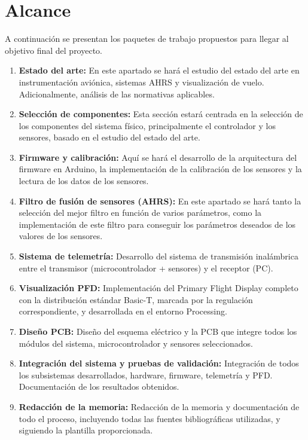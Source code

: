 \chapter{Alcance}

A continuación se presentan los paquetes de trabajo propuestos para llegar al objetivo final del proyecto.

\begin{enumerate}[font=\bfseries]
    \item \textbf{Estado del arte:} En este apartado se hará el estudio del estado del arte en instrumentación aviónica, sistemas AHRS y visualización de vuelo. Adicionalmente, análisis de las normativas aplicables.
    
    \item \textbf{Selección de componentes:} Esta sección estará centrada en la selección de los componentes del sistema físico, principalmente el controlador y los sensores, basado en el estudio del estado del arte.
    
    \item \textbf{Firmware y calibración:} Aquí se hará el desarrollo de la arquitectura del firmware en Arduino, la implementación de la calibración de los sensores y la lectura de los datos de los sensores.
    
    \item \textbf{Filtro de fusión de sensores (AHRS):} En este apartado se hará tanto la selección del mejor filtro en función de varios parámetros, como la implementación de este filtro para conseguir los parámetros deseados de los valores de los sensores.
    
    \item \textbf{Sistema de telemetría:} Desarrollo del sistema de transmisión inalámbrica entre el transmisor (microcontrolador + sensores) y el receptor (PC). 
    
    \item \textbf{Visualización PFD:} Implementación del Primary Flight Display completo con la distribución estándar Basic-T, marcada por la regulación correspondiente,  y desarrollada en el entorno Processing. 

    \item \textbf{Diseño PCB:} Diseño del esquema eléctrico y la PCB que integre todos los módulos del sistema, microcontrolador y sensores seleccionados.
    
    \item \textbf{Integración del sistema y pruebas de validación:} Integración de todos los subsistemas desarrollados, hardware, firmware, telemetría y PFD. Documentación de los resultados obtenidos.
    
    \item \textbf{Redacción de la memoria:} Redacción de la memoria y documentación de todo el proceso, incluyendo todas las fuentes bibliográficas utilizadas, y siguiendo la plantilla proporcionada.
\end{enumerate}

